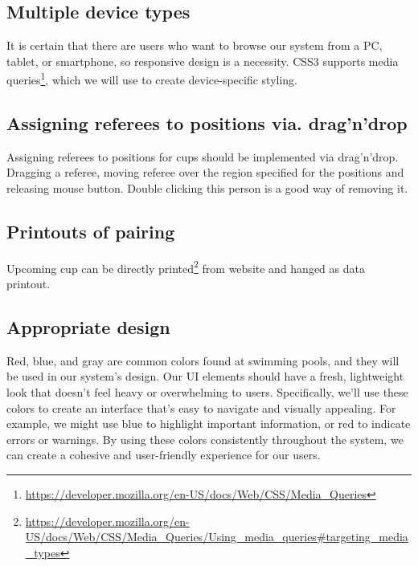 \subsection*{Multiple device types}
It is certain that there are users who want to browse our system from a PC, tablet, or smartphone, so responsive design is a necessity. CSS3 supports media queries\footnote{\url{https://developer.mozilla.org/en-US/docs/Web/CSS/Media_Queries}}, which we will use to create device-specific styling.
\subsection*{Assigning referees to positions via. drag'n'drop}
Assigning referees to positions for cups should be implemented via drag'n'drop. Dragging a referee, moving referee over the region specified for the positions and releasing mouse button. Double clicking this person is a good way of removing it.
\subsection*{Printouts of pairing}
Upcoming cup can be directly printed\footnote{\url{https://developer.mozilla.org/en-US/docs/Web/CSS/Media_Queries/Using_media_queries\#targeting_media_types}} from website and hanged as data printout. 
\subsection*{Appropriate design}
Red, blue, and gray are common colors found at swimming pools, and they will be used in our system's design. Our UI elements should have a fresh, lightweight look that doesn't feel heavy or overwhelming to users. Specifically, we'll use these colors to create an interface that's easy to navigate and visually appealing. For example, we might use blue to highlight important information, or red to indicate errors or warnings. By using these colors consistently throughout the system, we can create a cohesive and user-friendly experience for our users.
